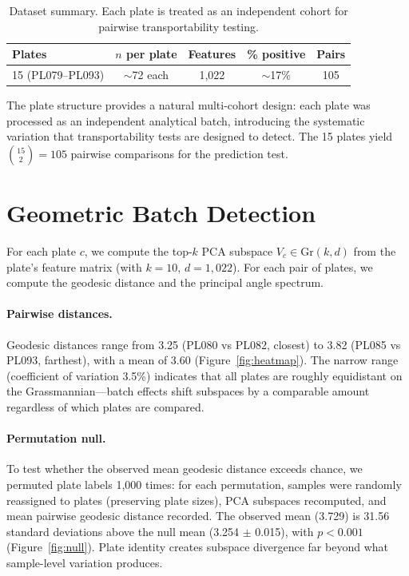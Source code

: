\documentclass{article}
\begin{document}
\begin{table}[t]
\centering
\caption{Dataset summary. Each plate is treated as an independent cohort for pairwise transportability testing.}
\label{tab:cohorts}
\begin{tabular}{lcccc}
\toprule
Plates & $n$ per plate & Features & \% positive & Pairs \\
\midrule
15 (PL079--PL093) & $\sim$72 each & 1{,}022 & $\sim$17\% & 105 \\
\bottomrule
\end{tabular}
\end{table}

The plate structure provides a natural multi-cohort design: each plate was processed as an independent analytical batch, introducing the systematic variation that transportability tests are designed to detect. The 15 plates yield $\binom{15}{2} = 105$ pairwise comparisons for the prediction test.


\section{Geometric Batch Detection}
\label{sec:batch}

For each plate $c$, we compute the top-$k$ PCA subspace $V_c \in \mathrm{Gr}(k, d)$ from the plate's feature matrix (with $k = 10$, $d = 1{,}022$). For each pair of plates, we compute the geodesic distance and the principal angle spectrum.

\paragraph{Pairwise distances.} Geodesic distances range from 3.25 (PL080 vs PL082, closest) to 3.82 (PL085 vs PL093, farthest), with a mean of 3.60 (Figure~\ref{fig:heatmap}). The narrow range (coefficient of variation 3.5\%) indicates that all plates are roughly equidistant on the Grassmannian---batch effects shift subspaces by a comparable amount regardless of which plates are compared.

\paragraph{Permutation null.} To test whether the observed mean geodesic distance exceeds chance, we permuted plate labels 1{,}000 times: for each permutation, samples were randomly reassigned to plates (preserving plate sizes), PCA subspaces recomputed, and mean pairwise geodesic distance recorded. The observed mean (3.729) is 31.56 standard deviations above the null mean (3.254 $\pm$ 0.015), with $p < 0.001$ (Figure~\ref{fig:null}). Plate identity creates subspace divergence far beyond what sample-level variation produces.
\end{document}
